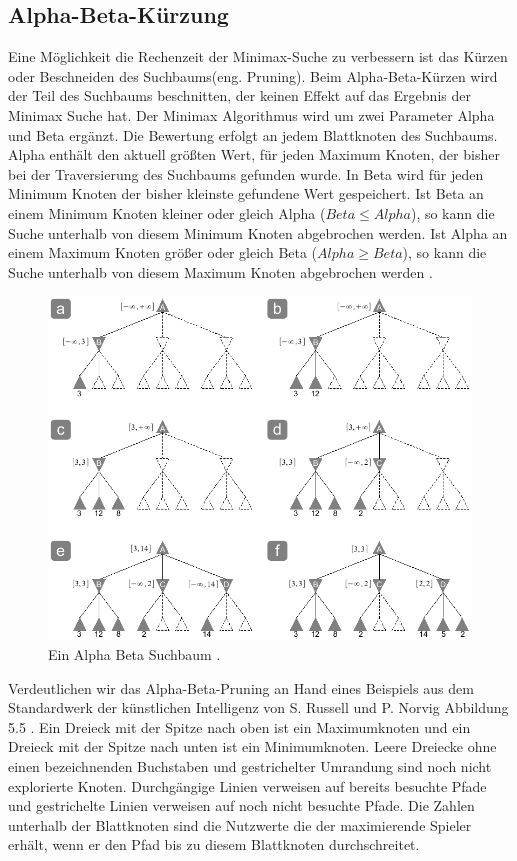 \subsection{Alpha-Beta-Kürzung}
\label{subsec:Alpha-Beta-Kürzung}
Eine Möglichkeit die Rechenzeit der Minimax-Suche zu verbessern ist das Kürzen oder Beschneiden des Suchbaums(eng. Pruning). Beim Alpha-Beta-Kürzen wird der Teil des Suchbaums beschnitten, der keinen Effekt auf das Ergebnis der Minimax Suche hat. Der Minimax Algorithmus wird um zwei Parameter Alpha und Beta ergänzt. Die Bewertung erfolgt an jedem Blattknoten des Suchbaums. Alpha enthält den aktuell größten Wert, für jeden Maximum Knoten, der bisher bei der Traversierung des Suchbaums gefunden wurde. In Beta wird für jeden Minimum Knoten der bisher kleinste gefundene Wert gespeichert. Ist Beta an einem Minimum Knoten kleiner oder gleich Alpha ($Beta \leq Alpha$), so kann die Suche unterhalb von diesem Minimum Knoten abgebrochen werden. Ist Alpha an einem Maximum Knoten größer oder gleich Beta ($Alpha \geq Beta$), so kann die Suche unterhalb von diesem Maximum Knoten abgebrochen werden \cite[116]{Ertel}. \\

\begin{figure}[!htbp]
  \centering
  \includegraphics[scale = 0.8]{inhalt/abbildungen/alpha_beta_suchbaum.pdf}
  \caption{Ein Alpha Beta Suchbaum \cite[213]{Russell}.}
  \label{fig:minimax_tictactoe}
\end{figure} 

Verdeutlichen wir das Alpha-Beta-Pruning an Hand eines Beispiels aus dem Standardwerk der künstlichen Intelligenz von S. Russell und P. Norvig Abbildung 5.5 \cite[213]{Russell}. Ein Dreieck mit der Spitze nach oben ist ein Maximumknoten und ein Dreieck mit der Spitze nach unten ist ein Minimumknoten. Leere Dreiecke ohne einen bezeichnenden Buchstaben und gestrichelter Umrandung sind noch nicht explorierte Knoten. Durchgängige Linien verweisen auf bereits besuchte Pfade und gestrichelte Linien verweisen auf noch nicht besuchte Pfade. Die Zahlen unterhalb der Blattknoten sind die Nutzwerte die der maximierende Spieler erhält, wenn er den Pfad bis zu diesem Blattknoten durchschreitet. \\

